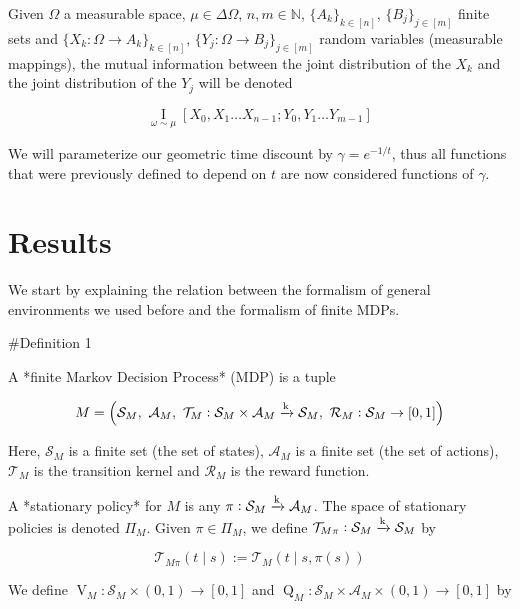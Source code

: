 \documentclass[a4paper]{article}
\DeclareMathOperator{\Supp}{supp}
\newcommand{\E}[1]{\underset{#1}{\operatorname{E}}}
\newcommand{\I}[1]{\underset{#1}{\operatorname{I}}}
\newcommand{\Nats}{\mathbb{N}}
\newcommand{\M}{\xrightarrow{\textnormal{k}}}
\newcommand{\A}{\mathcal{A}}
\newcommand{\St}{\mathcal{S}}
\newcommand{\T}{\mathcal{T}}
\newcommand{\R}{\mathcal{R}}
\newcommand{\V}{\operatorname{V}}
\newcommand{\Q}{\operatorname{Q}}
\begin{document}
Given $\Omega$ a measurable space, $\mu \in \Delta \Omega$, $n,m \in \Nats$, $\{A_k\}_{k \in [n]}$, $\{B_j\}_{j \in [m]}$ finite sets and $\{X_k: \Omega \rightarrow A_k\}_{k \in [n]}$, $\{Y_j: \Omega \rightarrow B_j\}_{j \in [m]}$ random variables (measurable mappings), the mutual information between the joint distribution of the $X_k$ and the joint distribution of the $Y_j$ will be denoted

$$\I{\omega \sim \mu}\left[X_0, X_1 \ldots X_{n-1}; Y_0, Y_1 \ldots Y_{m-1}\right]$$

We will parameterize our geometric time discount by $\gamma=e^{-1/t}$, thus all functions that were previously defined to depend on $t$ are now considered functions of $\gamma$.

\section{Results}

We start by explaining the relation between the formalism of general environments we used before and the formalism of finite MDPs.

\#Definition 1

A *finite Markov Decision Process* (MDP) is a tuple 

$$M=\left(\St_M,\ \A_M,\ \T_M: \St_M \times \A_M \M \St_M,\ \R_M: \St_M \rightarrow [0,1]\right)$$

Here, $\St_M$ is a finite set (the set of states), $\A_M$ is a finite set (the set of actions), $\T_M$ is the transition kernel and $\R_M$ is the reward function.

A *stationary policy* for $M$ is any $\pi: \St_M \M \A_M$. The space of stationary policies is denoted $\Pi_M$. Given $\pi \in \Pi_M$, we define $\T_{M\pi}: \St_M \M \St_M$ by

$$\T_{M\pi}(t \mid s) := \T_M\left(t \mid s, \pi(s)\right)$$

%
%
%
%

We define $\V_M : \St_M \times (0,1) \rightarrow [0,1]$ and $\Q_M: \St_M \times \A_M \times (0,1) \rightarrow [0,1]$ by
\end{document}
